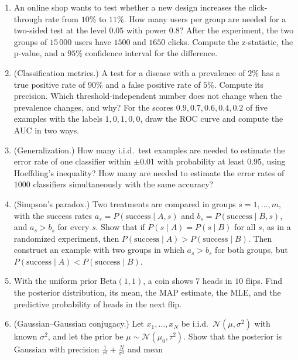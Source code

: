 \begin{enumerate}[leftmargin=*]
\begin{enumerate}[label=(\alph*)]
        \item In a permutation test with two groups of three observations each, what is the smallest possible one-sided p-value? What does this mean for very small experiments?
        \item Show that the bootstrap standard error of the sample mean (for $B \to \infty$) is $\frac{\hat\sigma}{\sqrt{N}}$ with $\hat\sigma^2 = \frac{1}{N}\sum_i (x_i - \bar x)^2$.
    \end{enumerate}
    \item An online shop wants to test whether a new design increases the click-through rate from $10\%$ to $11\%$. How many users per group are needed for a two-sided test at the level $0.05$ with power $0.8$? After the experiment, the two groups of $15\,000$ users have $1500$ and $1650$ clicks. Compute the z-statistic, the p-value, and a $95\%$ confidence interval for the difference.
    \item (Classification metrics.) A test for a disease with a prevalence of $2\%$ has a true positive rate of $90\%$ and a false positive rate of $5\%$. Compute its precision. Which threshold-independent number does not change when the prevalence changes, and why? For the scores $0.9, 0.7, 0.6, 0.4, 0.2$ of five examples with the labels $1, 0, 1, 0, 0$, draw the ROC curve and compute the AUC in two ways.
    \item (Generalization.) How many i.i.d.\ test examples are needed to estimate the error rate of one classifier within $\pm 0.01$ with probability at least $0.95$, using Hoeffding's inequality? How many are needed to estimate the error rates of $1000$ classifiers simultaneously with the same accuracy?
    \item (Simpson's paradox.) Two treatments are compared in groups $s = 1, \ldots, m$, with the success rates $a_s = P(\text{success} \mid A, s)$ and $b_s = P(\text{success} \mid B, s)$, and $a_s > b_s$ for every $s$. Show that if $P(s \mid A) = P(s \mid B)$ for all $s$, as in a randomized experiment, then $P(\text{success} \mid A) > P(\text{success} \mid B)$. Then construct an example with two groups in which $a_s > b_s$ for both groups, but $P(\text{success} \mid A) < P(\text{success} \mid B)$.
    \item \homework{} With the uniform prior Beta$(1, 1)$, a coin shows $7$ heads in $10$ flips. Find the posterior distribution, its mean, the MAP estimate, the MLE, and the predictive probability of heads in the next flip.
    \item (Gaussian--Gaussian conjugacy.) Let $x_1, \ldots, x_N$ be i.i.d.\ $\mathcal{N}(\mu, \sigma^2)$ with known $\sigma^2$, and let the prior be $\mu \sim \mathcal{N}(\mu_0, \tau^2)$. Show that the posterior is Gaussian with precision $\frac{1}{\tau^2} + \frac{N}{\sigma^2}$ and mean

\end{enumerate}
